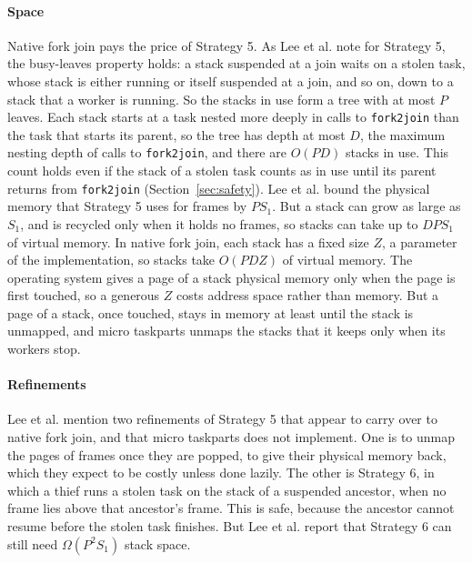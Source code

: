 \documentclass[sigplan,nonacm]{acmart}
\begin{document}
\paragraph{Space}
%
Native fork join pays the price of Strategy 5.
%
As Lee et al. note for Strategy 5, the busy-leaves property holds: a
stack suspended at a join waits on a stolen task, whose stack is
either running or itself suspended at a join, and so on, down to a
stack that a worker is running.
%
So the stacks in use form a tree with at most $P$ leaves.
%
Each stack starts at a task nested more deeply in calls to
\lstinline|fork2join| than the task that starts its parent, so the
tree has depth at most $D$, the maximum nesting depth of calls to
\lstinline|fork2join|, and there are $O(PD)$ stacks in use.
%
This count holds even if the stack of a stolen task counts as in use
until its parent returns from \lstinline|fork2join|
(Section~\ref{sec:safety}).
%
Lee et al. bound the physical memory that Strategy 5 uses for frames by
$PS_1$.
%
But a stack can grow as large as $S_1$, and is recycled only when it
holds no frames, so stacks can take up to $DPS_1$ of virtual memory.
%
In native fork join, each stack has a fixed size $Z$, a parameter of
the implementation, so stacks take $O(PDZ)$ of virtual memory.
%
The operating system gives a page of a stack physical memory only when
the page is first touched, so a generous $Z$ costs address space rather
than memory.
%
But a page of a stack, once touched, stays in memory at least until the
stack is unmapped, and micro taskparts unmaps the stacks that it
keeps only when its workers stop.

\paragraph{Refinements}
%
Lee et al. mention two refinements of Strategy 5 that appear to carry
over to native fork join, and that micro taskparts does not
implement.
%
One is to unmap the pages of frames once they are popped, to give their
physical memory back, which they expect to be costly unless done
lazily.
%
The other is Strategy 6, in which a thief runs a stolen task on the
stack of a suspended ancestor, when no frame lies above that ancestor's
frame.
%
This is safe, because the ancestor cannot resume before the stolen
task finishes.
%
But Lee et al. report that Strategy 6 can still need
$\Omega(P^2 S_1)$ stack space.
\end{document}
